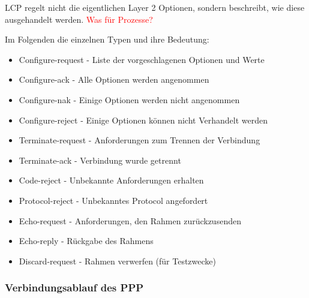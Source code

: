\documentclass[12pt, a4paper, ngerman]{article}
\begin{document}
LCP regelt nicht die eigentlichen Layer 2 Optionen, sondern beschreibt, wie diese ausgehandelt werden. \textcolor{red}{Was für Prozesse?}

Im Folgenden die einzelnen Typen und ihre Bedeutung:

\begin{itemize}
	\item Configure-request	- Liste der vorgeschlagenen Optionen und Werte
	\item Configure-ack		- Alle Optionen werden angenommen
	\item	Configure-nak		- Einige Optionen werden nicht angenommen
	\item Configure-reject	- Einige Optionen können nicht Verhandelt werden
	\item Terminate-request	- Anforderungen zum Trennen der Verbindung
	\item Terminate-ack		- Verbindung wurde getrennt
	\item Code-reject		- Unbekannte Anforderungen erhalten
	\item Protocol-reject		- Unbekanntes Protocol angefordert
	\item Echo-request		- Anforderungen, den Rahmen zurückzusenden
	\item Echo-reply		- Rückgabe des Rahmens
	\item	Discard-request	- Rahmen verwerfen (für Testzwecke)
\end{itemize} 



\subsubsection{Verbindungsablauf des PPP}
\end{document}
